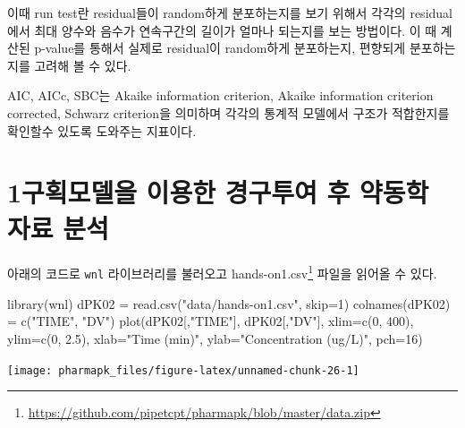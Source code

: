 \documentclass[
  11pt,
  krantz2, a4paper, twoside]{krantz}
\newenvironment{Shaded}{\begin{snugshade}}{\end{snugshade}}
\newcommand{\AttributeTok}[1]{\textcolor[rgb]{0.77,0.63,0.00}{#1}}
\newcommand{\DecValTok}[1]{\textcolor[rgb]{0.00,0.00,0.81}{#1}}
\newcommand{\FloatTok}[1]{\textcolor[rgb]{0.00,0.00,0.81}{#1}}
\newcommand{\FunctionTok}[1]{\textcolor[rgb]{0.00,0.00,0.00}{#1}}
\newcommand{\NormalTok}[1]{#1}
\newcommand{\OtherTok}[1]{\textcolor[rgb]{0.56,0.35,0.01}{#1}}
\newcommand{\StringTok}[1]{\textcolor[rgb]{0.31,0.60,0.02}{#1}}
\theoremstyle{definition}
\theoremstyle{definition}
\theoremstyle{definition}
\theoremstyle{definition}
\theoremstyle{remark}
\begin{document}
이때 run test란 residual들이 random하게 분포하는지를 보기 위해서 각각의
residual에서 최대 양수와 음수가 연속구간의 길이가 얼마나 되는지를 보는
방법이다. 이 때 계산된 p-value를 통해서 실제로 residual이 random하게
분포하는지, 편향되게 분포하는지를 고려해 볼 수 있다.

AIC, AICc, SBC는 Akaike information criterion, Akaike information
criterion corrected, Schwarz criterion을 의미하며 각각의 통계적 모델에서
구조가 적합한지를 확인할수 있도록 도와주는 지표이다.

\hypertarget{uxad6cuxd68duxbaa8uxb378uxc744-uxc774uxc6a9uxd55c-uxacbduxad6cuxd22cuxc5ec-uxd6c4-uxc57duxb3d9uxd559-uxc790uxb8cc-uxbd84uxc11d}{%
\section{\texorpdfstring{1구획모델을 이용한 경구투여 후 약동학 자료 분석}{1구획모델을 이용한 경구투여 후 약동학 자료 분석}}\label{uxad6cuxd68duxbaa8uxb378uxc744-uxc774uxc6a9uxd55c-uxacbduxad6cuxd22cuxc5ec-uxd6c4-uxc57duxb3d9uxd559-uxc790uxb8cc-uxbd84uxc11d}}

아래의 코드로 \texttt{wnl} 라이브러리를 불러오고 hands-on1.csv\footnote{\url{https://github.com/pipetcpt/pharmapk/blob/master/data.zip}} 파일을 읽어올 수 있다.

\begin{Shaded}
\begin{Highlighting}[]
\FunctionTok{library}\NormalTok{(wnl)}
\NormalTok{dPK02 }\OtherTok{=} \FunctionTok{read.csv}\NormalTok{(}\StringTok{"data/hands{-}on1.csv"}\NormalTok{, }\AttributeTok{skip=}\DecValTok{1}\NormalTok{)}
\FunctionTok{colnames}\NormalTok{(dPK02) }\OtherTok{=} \FunctionTok{c}\NormalTok{(}\StringTok{"TIME"}\NormalTok{, }\StringTok{"DV"}\NormalTok{)}
\FunctionTok{plot}\NormalTok{(dPK02[,}\StringTok{"TIME"}\NormalTok{], dPK02[,}\StringTok{"DV"}\NormalTok{], }\AttributeTok{xlim=}\FunctionTok{c}\NormalTok{(}\DecValTok{0}\NormalTok{, }\DecValTok{400}\NormalTok{), }\AttributeTok{ylim=}\FunctionTok{c}\NormalTok{(}\DecValTok{0}\NormalTok{, }\FloatTok{2.5}\NormalTok{), }
     \AttributeTok{xlab=}\StringTok{"Time (min)"}\NormalTok{, }\AttributeTok{ylab=}\StringTok{"Concentration (ug/L)"}\NormalTok{, }\AttributeTok{pch=}\DecValTok{16}\NormalTok{)}
\end{Highlighting}
\end{Shaded}

\begin{center}\texttt{[image: pharmapk\_files/figure-latex/unnamed-chunk-26-1]} \end{center}
\end{document}
